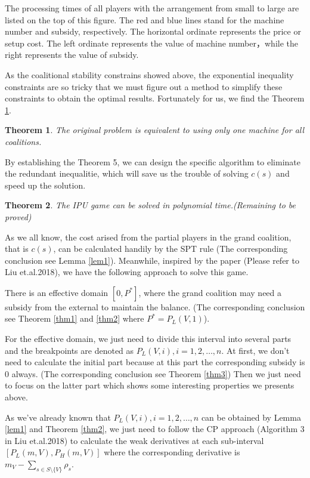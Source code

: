 \documentclass[UTF8]{article}
\newtheorem{thm}{\hspace{2em}Theorem}
\begin{document}
The processing times of all players with the arrangement from small to large are listed on the top of this figure.
The red and blue lines stand for the machine number and subsidy, respectively.
The horizontal ordinate represents the price or setup cost.
The left ordinate represents the value of machine number，while the right represents the value of subsidy.

As the coalitional stability constrains showed above, the exponential inequality constraints are so tricky that we must figure out a method to simplify these constraints to obtain the optimal results. Fortunately for us, we find the Theorem \ref{thm5}.


\begin{thm}\label{thm5}
The original problem is equivalent to using only one machine for all coalitions.

\end{thm}

By establishing the Theorem 5, we can design the specific algorithm to eliminate the redundant inequalitie, which will save us the trouble of solving $c(s)$ and speed up the solution.

\begin{thm}\label{thm6}
The IPU game can be solved in polynomial time.(Remaining to be proved)
\end{thm}

As we all know, the cost arised from the partial players in the grand coalition, that is $c(s)$, can be calculated handily by the SPT rule (The corresponding conclusion see Lemma \ref{lem1}). Meanwhile, inspired by the paper (Please refer to Liu et.al.2018), we have the following approach to solve this game.

There is an effective domain $[0, P^*]$, where the grand coalition may need a subsidy from the external to maintain the balance.
(The corresponding conclusion see Theorem \ref{thm1} and \ref{thm2} where $P^* = P_L(V,1)$).

For the effective domain, we just need to divide this interval into several parts and the breakpoints are denoted as $P_L(V,i), i = 1,2,\ldots,n$.  At first, we don't need to calculate the initial part because at this part the corresponding subsidy is 0 always. (The corresponding conclusion see Theorem \ref{thm3}) Then we just need to focus on the latter part which shows some interesting properties we presents above.

As we've already known that $P_L(V,i), i = 1,2,\ldots,n$ can be obtained by Lemma \ref{lem1} and Theorem \ref{thm2}, we just need to follow the CP approach (Algorithm 3 in Liu et.al.2018) to calculate the weak derivatives at each sub-interval $[P_L(m,V),P_H(m,V)]$ where the corresponding derivative is $m_V-\sum_{s\in S\setminus\{V\}} \rho_s$.
\end{document}
